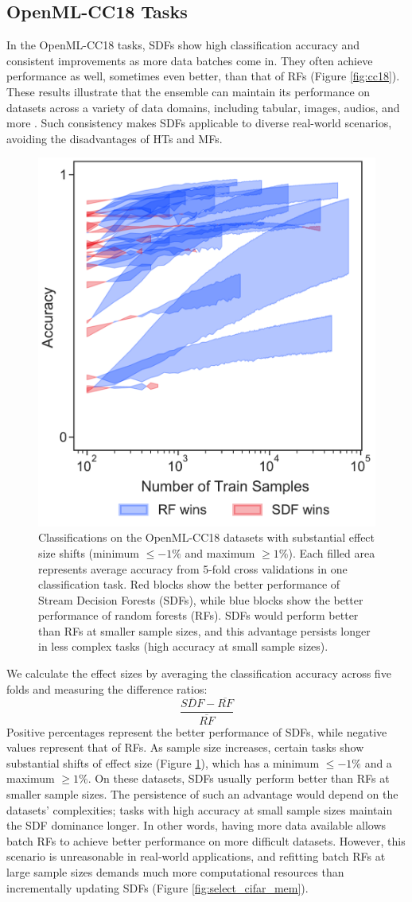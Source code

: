 \subsection{OpenML-CC18 Tasks}
In the OpenML-CC18 tasks, SDFs show high classification accuracy and consistent improvements as more data batches come in. They often achieve performance as well, sometimes even better, than that of RFs (Figure \ref{fig:cc18}). These results illustrate that the ensemble can maintain its performance on datasets across a variety of data domains, including tabular, images, audios, and more \citep{bischl_openml_2019}. Such consistency makes SDFs applicable to diverse real-world scenarios, avoiding the disadvantages of HTs and MFs.

\begin{figure}[!htb]
\centering
\includegraphics[width=0.4\columnwidth]{cc18_fill}
  \caption{Classifications on the OpenML-CC18 datasets with substantial effect size shifts (minimum $\leq -1\%$ and maximum $\geq 1\%$). Each filled area represents average accuracy from 5-fold cross validations in one classification task. Red blocks show the better performance of Stream Decision Forests (SDFs), while blue blocks show the better performance of random forests (RFs). SDFs would perform better than RFs at smaller sample sizes, and this advantage persists longer in less complex tasks (high accuracy at small sample sizes).
  }
\label{fig:cc18_fill}
\end{figure}

We calculate the effect sizes by averaging the classification accuracy across five folds and measuring the difference ratios:
\begin{equation*} \frac{\overline{SDF} - \overline{RF}}{\overline{RF}} \tag{2} \end{equation*}
Positive percentages represent the better performance of SDFs, while negative values represent that of RFs. 
As sample size increases, certain tasks show substantial shifts of effect size (Figure \ref{fig:cc18_fill}), which has a minimum $\leq -1\%$ and a maximum $\geq 1\%$. 
On these datasets, SDFs usually perform better than RFs at smaller sample sizes. The persistence of such an advantage would depend on the datasets' complexities; tasks with high accuracy at small sample sizes maintain the SDF dominance longer. In other words, having more data available allows batch RFs to achieve better performance on more difficult datasets. 
However, this scenario is unreasonable in real-world applications, and refitting batch RFs at large sample sizes demands much more computational resources than incrementally updating SDFs (Figure \ref{fig:select_cifar_mem}).

